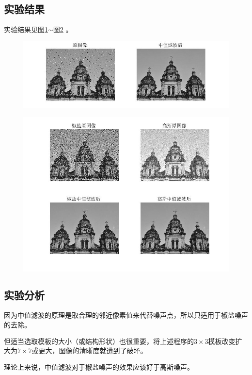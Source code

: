 \documentclass[12pt]{article}
\begin{document}
\subsection{实验结果}
实验结果见图\ref{jiaoyan1}$\sim$图\ref{jiaoyan2}
。
\begin{figure}[htbp]
  \centering
  \includegraphics[width=\textwidth]{picture/jiaoyanzhongzhilvbo}
  \caption{}\label{jiaoyan1}
\end{figure}
\begin{figure}[htbp]
  \centering
  \includegraphics[width=\textwidth]{picture/gaosijiaoyanzhongzhilvbo}
  \caption{}\label{jiaoyan2}
\end{figure}
\subsection{实验分析}
因为中值滤波的原理是取合理的邻近像素值来代替噪声点，所以只适用于椒盐噪声的去除。\par
但适当选取模板的大小（或结构形状）也很重要，将上述程序的$3\times 3$模板改变扩大为$7\times 7$或更大，图像的清晰度就遭到了破坏。\par
理论上来说，中值滤波对于椒盐噪声的效果应该好于高斯噪声。
\newpage
\end{document}
